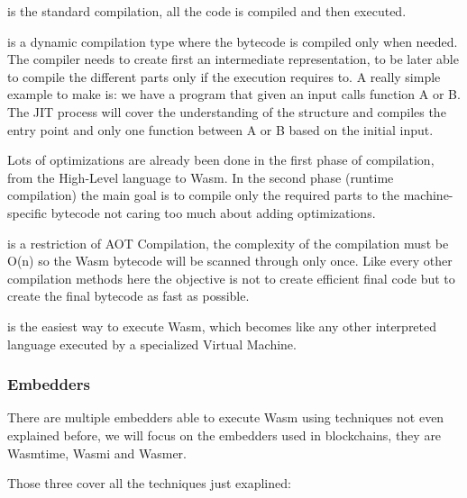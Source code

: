 \documentclass[../main.tex]{subfiles}
\begin{document}
\begin{description}[font=$\bullet$ \scshape\bfseries]
  \item[AOT]
        is the standard compilation, all the code is compiled and then executed.
  \item[JIT]
        is a dynamic compilation type where the bytecode is compiled only when needed. The compiler needs to create first an intermediate representation, to be later able to compile the different parts only if the execution requires to. A really simple example to make is: we have a program that given an input calls function A or B. The JIT process will cover the understanding of the structure and compiles the entry point and only one function between A or B based on the initial input.

        Lots of optimizations are already been done in the first phase of compilation, from the High-Level language to Wasm. In the second phase (runtime compilation) the main goal is to compile only the required parts to the machine-specific bytecode not caring too much about adding optimizations.
  \item[SPC]
        is a restriction of AOT Compilation, the complexity of the compilation must be O(n) so the Wasm bytecode will be scanned through only once. Like every other compilation methods here the objective is not to create efficient final code but to create the final bytecode as fast as possible.
  \item[Interpretation] %
        is the easiest way to execute Wasm, which becomes like any other interpreted language executed by a specialized Virtual Machine.

\end{description}

\subsubsection{Embedders}

There are multiple embedders able to execute Wasm using techniques not even explained before, we will focus on the embedders used in blockchains, they are Wasmtime, Wasmi and Wasmer.

Those three cover all the techniques just exaplined:
\end{document}
